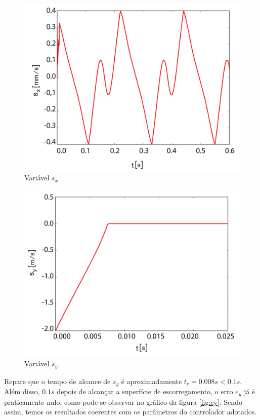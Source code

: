 \documentclass[]{politex}
\begin{document}
\begin{multicols}{2}
\begin{figure}[H]
	\centering
	\includegraphics[scale=0.31]{../figures/sx.pdf}  
	\caption{Variável $s_x$}
	\label{fig:sx}
\end{figure}

\begin{figure}[H]
	\centering
	\includegraphics[scale=0.31]{../figures/sy.pdf}  
	\caption{Variável $s_y$}
	\label{fig:sy}
\end{figure}
\end{multicols}

Repare que o tempo de alcance de $s_y$ é aproximadamente $t_r = 0.008s < 0.1s$. Além disso, $0.1s$ depois de alcançar a superfície de escorregamento, o erro $e_y$ já é praticamente nulo, como pode-se observar no gráfico da figura \ref{fig:ey}. Sendo assim, temos os resultados coerentes com os parâmetros do controlador adotados. \\
\end{document}
